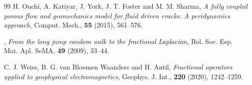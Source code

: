 \documentclass[12pt,reqno]{amsart}
\theoremstyle{plain}
\theoremstyle{definition}
\theoremstyle{remark}
\numberwithin{equation}{section}
\begin{document}
\begin{thebibliography}{99}
 H. Ouchi, A. Katiyar, J. York, J. T. Foster and M. M. Sharma, {\em A fully coupled porous flow and geomechanics model for fluid driven cracks: A peridynamics approach}, Comput. Mech., {\bf 55} (2015), 561--576.


, {\em From the long jump random walk to the fractional {L}aplacian}, {Bol. Soc. Esp. Mat. Apl. SeMA}, {\bf 49} (2009), {33--44}.

 C. J. Weiss, B. G. van Bloemen Waanders and H. Antil, {\em Fractional operators applied to geophysical electromagnetics}, Geophys. J. Int., {\bf 220} (2020), 1242--1259.



\end{thebibliography}
\end{document}
